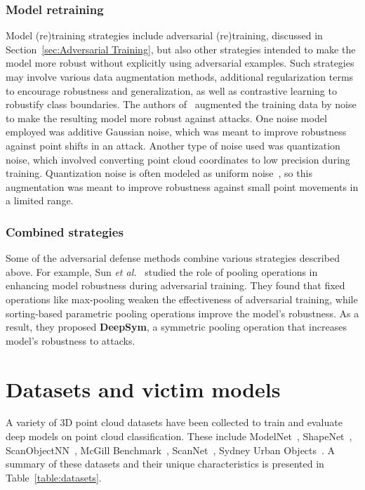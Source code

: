 \documentclass{ieeeaccess}
\def\etal{\textit{et al.}}
\begin{document}
\subsubsection{Model retraining}
Model (re)training strategies include adversarial (re)training, discussed in Section~\ref{sec:Adversarial Training}, but also other strategies intended to make the model more robust without explicitly using adversarial examples. Such strategies may involve various data augmentation methods, additional regularization terms to encourage robustness and generalization, as well as contrastive learning to robustify class boundaries. The authors of~\cite{zhang2022comprehensive,yang2019adversarial} augmented the training data by noise to make the resulting model more robust against attacks. One noise model employed was additive Gaussian noise, which was meant to improve robustness against point shifts in an attack. Another type of noise used was quantization noise, which involved converting point cloud coordinates to low precision during training. Quantization noise is often modeled as uniform noise~\cite{Widrow2008}, so this augmentation was meant to improve robustness against small point movements in a limited range.

\subsubsection{Combined strategies}
Some of the adversarial defense methods combine various strategies described above. 
For example, Sun \etal~\cite{sun2020adversarial} studied the role of pooling operations in enhancing model robustness during adversarial training. They found that fixed operations like max-pooling weaken the effectiveness of adversarial training, while sorting-based parametric pooling operations improve the model's robustness. As a result, they proposed \textbf{DeepSym}, a symmetric pooling operation that increases model's robustness to attacks.




\section{Datasets and victim models}
\label{sec:Taxonomy}

A variety of 3D point cloud datasets have been collected to train and evaluate deep models on point cloud classification. These include ModelNet~\cite{wu20153d}, ShapeNet~\cite{chang2015shapenet}, ScanObjectNN~\cite{uy2019revisiting}, McGill Benchmark~\cite{siddiqi2008retrieving}, ScanNet~\cite{dai2017scannet}, Sydney Urban Objects~\cite{de2013unsupervised}. 
A summary of these datasets and their unique characteristics is presented in Table~\ref{table:datasets}.
\end{document}
